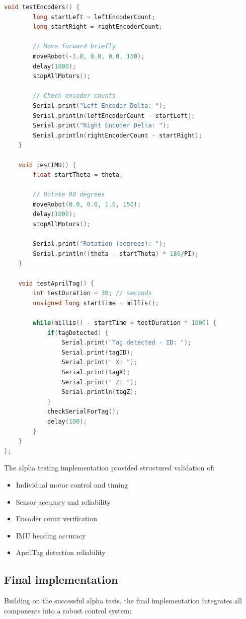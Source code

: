 \documentclass{article}
\begin{document}
\begin{lstlisting}[language=C, basicstyle=\ttfamily\footnotesize, frame=single, xleftmargin=10mm, xrightmargin=10mm]
    void testEncoders() {
        long startLeft = leftEncoderCount;
        long startRight = rightEncoderCount;
        
        // Move forward briefly
        moveRobot(-1.0, 0.0, 0.0, 150);
        delay(1000);
        stopAllMotors();
        
        // Check encoder counts
        Serial.print("Left Encoder Delta: ");
        Serial.println(leftEncoderCount - startLeft);
        Serial.print("Right Encoder Delta: ");
        Serial.println(rightEncoderCount - startRight);
    }
    
    void testIMU() {
        float startTheta = theta;
        
        // Rotate 90 degrees
        moveRobot(0.0, 0.0, 1.0, 150);
        delay(1000);
        stopAllMotors();
        
        Serial.print("Rotation (degrees): ");
        Serial.println((theta - startTheta) * 180/PI);
    }
    
    void testAprilTag() {
        int testDuration = 30; // seconds
        unsigned long startTime = millis();
        
        while(millis() - startTime < testDuration * 1000) {
            if(tagDetected) {
                Serial.print("Tag detected - ID: ");
                Serial.print(tagID);
                Serial.print(" X: ");
                Serial.print(tagX);
                Serial.print(" Z: ");
                Serial.println(tagZ);
            }
            checkSerialForTag();
            delay(100);
        }
    }
};
\end{lstlisting}

The alpha testing implementation provided structured validation of:
\begin{itemize}
    \item Individual motor control and timing
    \item Sensor accuracy and reliability
    \item Encoder count verification
    \item IMU heading accuracy
    \item AprilTag detection reliability
\end{itemize}

\subsection{Final implementation}
Building on the successful alpha tests, the final implementation integrates all components into a robust control system:
\end{document}
